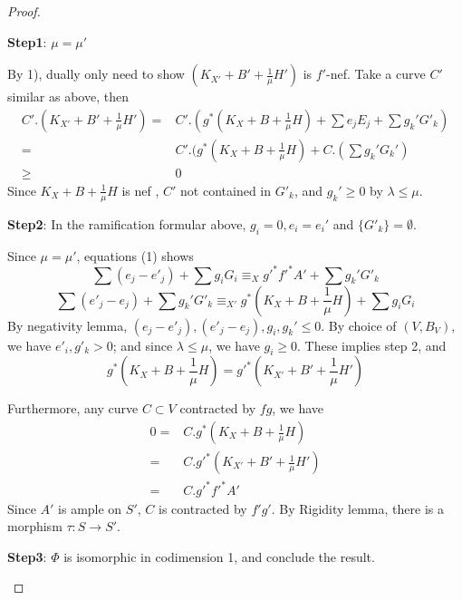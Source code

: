 \documentclass{article}
\begin{document}
\begin{proof}
\begin{enumerate}
    \textbf{Step1}: $ \mu=\mu' $
    
    By 1), dually only need to show $ (K_{X'}+B'+\frac{1}{\mu}H') $ is $ f' $-nef. Take a curve $ C' $ similar as above, then 
    \begin{equation*}
      \begin{aligned}
        C'.(K_{X'}+B'+\frac{1}{\mu}H')=&C'.(g^*(K_{X}+B+\frac{1}{\mu}H)+\sum e_jE_j+ \sum g_k'G'_k)\\
        =&C'.(g^*(K_{X}+B+\frac{1}{\mu}H)+C.(\sum g_k'G_k')\\
        \geqslant&0
      \end{aligned}
    \end{equation*}
    Since $ K_{X}+B+\frac{1}{\mu}H $ is nef , $ C' $ not contained in $ G'_k $, and $ g_k'\geqslant 0 $ by $ \lambda\leqslant \mu. $
    
    \textbf{Step2}: In the ramification formular above, $ g_i=0, e_i=e_i' $ and $ \{G'_k\}=\emptyset $.
    
    Since $ \mu=\mu' $, equations (1) shows
    $$ \sum(e_j-e'_j)+\sum g_iG_i\equiv_X g'^*f'^*A'+\sum g_k'G'_k $$
    $$ \sum(e'_j-e_j)+\sum g_k'G'_k\equiv_{X'} g^*(K_{X}+B+\frac{1}{\mu}H)+\sum g_iG_i $$
    By negativity lemma, $ (e_j-e'_j), (e'_j-e_j), g_i,g_k'\leqslant 0$. By choice of $ (V,B_V) $, we have $ e'_i,g'_k>0 $; and since $\lambda\leqslant\mu$, we have $ g_i\geqslant 0 $. These implies step 2, and 
    $$ g^*(K_{X}+B+\frac{1}{\mu}H)=g'^*(K_{X'}+B'+\frac{1}{\mu}H') $$
    
    Furthermore, any curve $ C\subset V $ contracted by $ fg $, we have
    \begin{equation*}
      \begin{aligned}
        0=&C.g^*(K_{X}+B+\frac{1}{\mu}H)\\
        =&C.g'^*(K_{X'}+B'+\frac{1}{\mu}H') \\
        =&C.g'^*f'^*A'
      \end{aligned}
    \end{equation*}
    Since $ A' $ is ample on $ S' $, $ C $ is contracted by $ f'g' $. By Rigidity lemma, there is a morphism $ \tau:S\to S' $.
    
    \textbf{Step3}: $ \Phi $ is isomorphic in codimension 1, and conclude the result.
    

\end{enumerate}
\end{proof}
\end{document}
